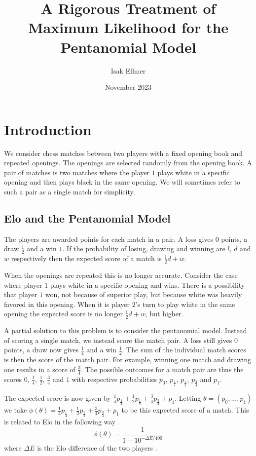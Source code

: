 \documentclass{article}
\title{A Rigorous Treatment of Maximum Likelihood for the Pentanomial Model}
\author{Isak Ellmer}
\date{November 2023}
\theoremstyle{plain}
\theoremstyle{definition}
\begin{document}
\maketitle

\section{Introduction}
We consider chess matches between two players with a fixed opening book and repeated openings.
The openings are selected randomly from the opening book. A pair of matches is two matches where
the player $1$ plays white in a specific opening and then plays black in the same opening.
We will sometimes refer to such a pair as a single match for simplicity.

\subsection{Elo and the Pentanomial Model}
The players are awarded points for each match in a pair. A loss gives $0$ points,
a draw $\frac12$ and a win $1$. If the probability of losing, drawing and winning
are $l$, $d$ and $w$ respectively then the expected score of a match is $\frac12d+w$.

When the openings are repeated this is no longer accurate. Consider the case where
player $1$ plays white in a specific opening and wins. There is a possibility that
player $1$ won, not because of superior play, but because white was heavily favored
in this opening. When it is player $2$'s turn to play white in the same opening
the expected score is no longer $\frac12d+w$, but higher.

A partial solution to this problem is to consider the pentanomial model. Instead of
scoring a single match, we instead score the match pair. A loss still gives $0$ points,
a draw now gives $\frac14$ and a win $\frac12$. The sum of the individual match scores
is then the score of the match pair. For example, winning one match and drawing one results
in a score of $\frac34$. The possible outcomes for a match pair are thus the scores
$0$, $\frac14$, $\frac12$, $\frac34$ and $1$ with respective probabilities
$p_0$, $p_\frac14$, $p_\frac12$, $p_\frac34$ and $p_1$.

The expected score is now given by $\frac14p_\frac14+\frac12p_\frac12+\frac34p_\frac34+p_1$.
Letting $\theta=(p_0,...,p_1)$ we take $\phi(\theta)=\frac14p_\frac14+\frac12p_\frac12+
\frac34p_\frac34+p_1$ to be this expected score of a match.
This is related to Elo in the following way
$$\phi(\theta)=\frac1{1+10^{-\Delta E/400}}$$
where $\Delta E$ is the Elo difference of the two players \cite{wikipedia_elo}.
\end{document}
